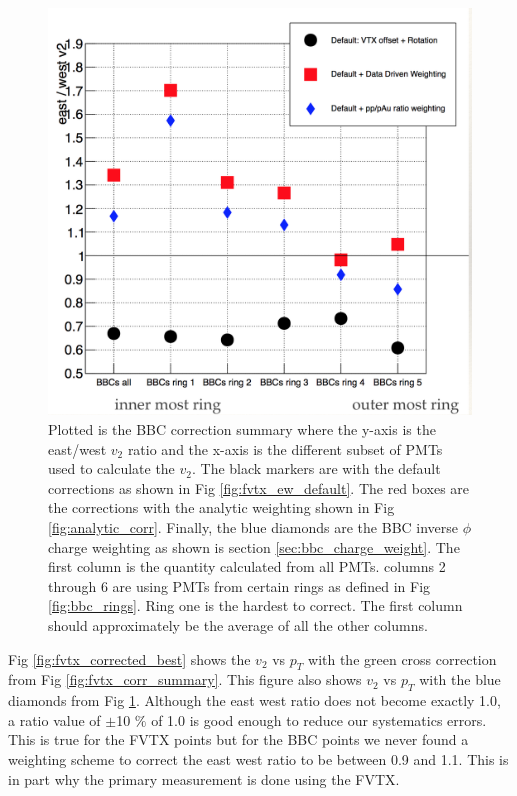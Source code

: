 \begin{figure}[!h]
\begin{center}
\includegraphics[width=0.5\linewidth]{figs/bbc_correction_summary.png}
\caption{Plotted is the BBC correction summary where the y-axis is the east/west $v_2$ ratio and the x-axis is the different subset of PMTs used to calculate the $v_2$. The black markers are with the default corrections as shown in Fig \ref{fig:fvtx_ew_default}. The red boxes are the corrections with the analytic weighting shown in Fig \ref{fig:analytic_corr}. Finally, the blue diamonds are the BBC inverse $\phi$ charge weighting as shown is section \ref{sec:bbc_charge_weight}. The first column is the quantity calculated from all PMTs. columns 2 through 6 are using PMTs from certain rings as defined in Fig \ref{fig:bbc_rings}. Ring one is the hardest to correct. The first column should approximately be the average of all the other columns.}
\label{fig:bbc_corr_summary}
\end{center}
\end{figure}

Fig \ref{fig:fvtx_corrected_best} shows the $v_2$ vs $p_T$ with the green cross correction from Fig \ref{fig:fvtx_corr_summary}. This figure also shows $v_2$ vs $p_T$ with the blue diamonds from Fig \ref{fig:bbc_corr_summary}. Although the east west ratio does not become exactly 1.0, a ratio value of $\pm$10 $\%$ of 1.0 is good enough to reduce our systematics errors. This is true for the FVTX points but for the BBC points we never found a weighting scheme to correct the east west ratio to be between 0.9 and 1.1. This is in part why the primary measurement is done using the FVTX.

